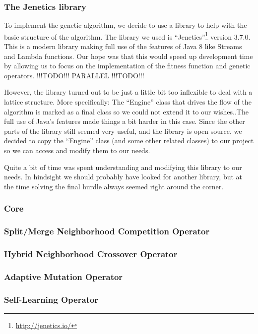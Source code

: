 \subsubsection{The Jenetics library}
To implement the genetic algorithm, we decide to use a library to help with the basic structure of the algorithm. The library we used is ``Jenetics''\footnote{\url{http://jenetics.io/}} version 3.7.0. This is a modern library making full use of the features of Java 8 like Streams and Lambda functions. Our hope was that this would speed up development time by allowing us to focus on the implementation of the fitness function and genetic operators. !!!TODO!!! PARALLEL !!!TODO!!!
\par
However, the library turned out to be just a little bit too inflexible to deal with a lattice structure. More specifically: The ``Engine'' class that drives the flow of the algorithm is marked as a final class so we could not extend it to our wishes..The full use of Java's features made things a bit harder in this case. Since the other parts of the library still seemed very useful, and the library is open source, we decided to copy the ``Engine'' class (and some other related classes) to our project so we can access and modify them to our needs. 
\par
Quite a bit of time was spent understanding and modifying this library to our needs. In hindsight we should probably have looked for another library, but at the time solving the final hurdle always seemed right around the corner.
\subsubsection{Core}
\subsubsection{Split/Merge Neighborhood Competition Operator}
\subsubsection{Hybrid Neighborhood Crossover Operator}
\subsubsection{Adaptive Mutation Operator}
\subsubsection{Self-Learning Operator}



